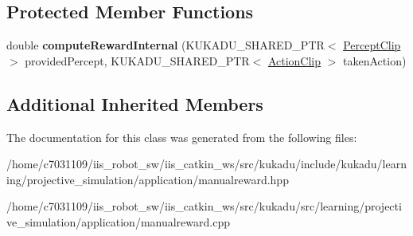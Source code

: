\subsection*{Protected Member Functions}
\begin{DoxyCompactItemize}
\item 
\hypertarget{classkukadu_1_1ManualReward_accd1c514e0c2e4f64c80dc8dc0dd3a43}{double {\bfseries compute\-Reward\-Internal} (K\-U\-K\-A\-D\-U\-\_\-\-S\-H\-A\-R\-E\-D\-\_\-\-P\-T\-R$<$ \hyperlink{classkukadu_1_1PerceptClip}{Percept\-Clip} $>$ provided\-Percept, K\-U\-K\-A\-D\-U\-\_\-\-S\-H\-A\-R\-E\-D\-\_\-\-P\-T\-R$<$ \hyperlink{classkukadu_1_1ActionClip}{Action\-Clip} $>$ taken\-Action)}\label{classkukadu_1_1ManualReward_accd1c514e0c2e4f64c80dc8dc0dd3a43}

\end{DoxyCompactItemize}
\subsection*{Additional Inherited Members}


The documentation for this class was generated from the following files\-:\begin{DoxyCompactItemize}
\item 
/home/c7031109/iis\-\_\-robot\-\_\-sw/iis\-\_\-catkin\-\_\-ws/src/kukadu/include/kukadu/learning/projective\-\_\-simulation/application/manualreward.\-hpp\item 
/home/c7031109/iis\-\_\-robot\-\_\-sw/iis\-\_\-catkin\-\_\-ws/src/kukadu/src/learning/projective\-\_\-simulation/application/manualreward.\-cpp\end{DoxyCompactItemize}
